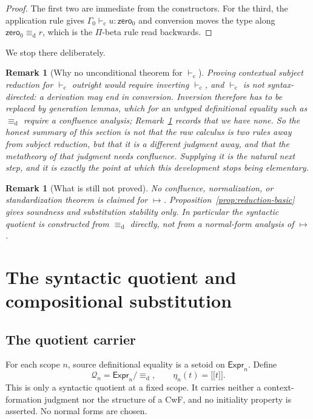 \documentclass[10pt,reqno]{amsart}
\newtheorem{remark}[theorem]{Remark}
\newcommand{\Expr}{\mathsf{Expr}}
\newcommand{\Zero}{\mathsf{zero}}
\newcommand{\den}[1]{\mathopen{\lbrack\!\lbrack}#1\mathclose{\rbrack\!\rbrack}}
\newcommand{\defeq}{\mathrel{\equiv_{\mathrm d}}}
\newcommand{\red}{\mathrel{\longmapsto}}
\newcommand{\vdashC}{\vdash_{\mathrm{c}}}
\newcommand{\Q}{\mathcal{Q}}
\begin{document}
\begin{proof}
The first two are immediate from the constructors.  For the third, the
application rule gives \(\Gamma_0\vdashC u:\Zero_0\) and conversion moves the
type along \(\Zero_0\defeq r\), which is the \(\Pi\)-beta rule read backwards.
\end{proof}

We stop there deliberately.

\begin{remark}[Why no unconditional theorem for \(\vdashC\)]
\label{rem:no-unconditional}
Proving contextual subject reduction for \(\vdashC\) outright would require
inverting \(\vdashC\), and \(\vdashC\) is not syntax-directed: a derivation may
end in conversion.  Inversion therefore has to be replaced by generation
lemmas, which for an \emph{untyped} definitional equality such as \(\defeq\)
require a confluence analysis; Remark~\ref{rem:reduction-limits} records that
we have none.  So the honest summary of this section is not that the raw
calculus is two rules away from subject reduction, but that it is a
\emph{different judgment} away, and that the metatheory of that judgment needs
confluence.  Supplying it is the natural next step, and it is exactly the point
at which this development stops being elementary.
\end{remark}

\begin{remark}[What is still not proved]
\label{rem:reduction-limits}
No confluence, normalization, or standardization theorem is claimed for
\(\red\).  Proposition~\ref{prop:reduction-basic} gives soundness and
substitution stability only.  In particular the syntactic quotient is
constructed from \(\defeq\) directly, not from a normal-form analysis of
\(\red\).
\end{remark}

\section{The syntactic quotient and compositional substitution}
\label{sec:syntactic-quotient}

\subsection{The quotient carrier}

For each scope \(n\), source definitional equality is a setoid on
\(\Expr_n\).  Define
\[
              \Q_n=\Expr_n/{\defeq},
       \qquad \eta_n(t)=\den t.
\tag{7.1}\label{eq:syntactic-quotient}
\]
This is only a syntactic quotient at a fixed scope.  It carries neither a
context-formation judgment nor the structure of a CwF, and no initiality
property is asserted.  No normal forms are chosen.
\end{document}
